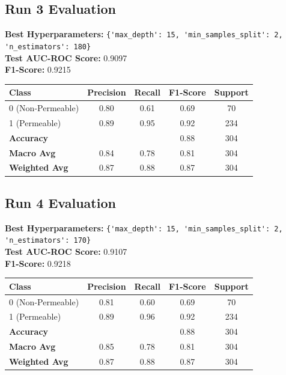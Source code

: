 \documentclass{article}
\begin{document}
\subsection*{Run 3 Evaluation}

\textbf{Best Hyperparameters:} \verb|{'max_depth': 15, 'min_samples_split': 2, 'n_estimators': 180}|\\
\textbf{Test AUC-ROC Score:} 0.9097\\
\textbf{F1-Score:} 0.9215

\begin{table}[htbp]
\centering
\label{tab:rf_class_report_3}
\begin{tabular}{lcccc}
\toprule
\textbf{Class} & \textbf{Precision} & \textbf{Recall} & \textbf{F1-Score} & \textbf{Support} \\
\midrule
0 (Non-Permeable) & 0.80 & 0.61 & 0.69 & 70 \\
1 (Permeable)     & 0.89 & 0.95 & 0.92 & 234 \\
\midrule
\textbf{Accuracy}     &      &      & 0.88 & 304 \\
\textbf{Macro Avg}    & 0.84 & 0.78 & 0.81 & 304 \\
\textbf{Weighted Avg} & 0.87 & 0.88 & 0.87 & 304 \\
\bottomrule
\end{tabular}
\end{table}


\subsection*{Run 4 Evaluation}

\textbf{Best Hyperparameters:} \verb|{'max_depth': 15, 'min_samples_split': 2, 'n_estimators': 170}|\\
\textbf{Test AUC-ROC Score:} 0.9107\\
\textbf{F1-Score:} 0.9218

\begin{table}[htbp]
\centering
\label{tab:rf_class_report_run4}
\begin{tabular}{lcccc}
\toprule
\textbf{Class} & \textbf{Precision} & \textbf{Recall} & \textbf{F1-Score} & \textbf{Support} \\
\midrule
0 (Non-Permeable) & 0.81 & 0.60 & 0.69 & 70 \\
1 (Permeable)     & 0.89 & 0.96 & 0.92 & 234 \\
\midrule
\textbf{Accuracy}     &      &      & 0.88 & 304 \\
\textbf{Macro Avg}    & 0.85 & 0.78 & 0.81 & 304 \\
\textbf{Weighted Avg} & 0.87 & 0.88 & 0.87 & 304 \\
\bottomrule
\end{tabular}
\end{table}
\end{document}

